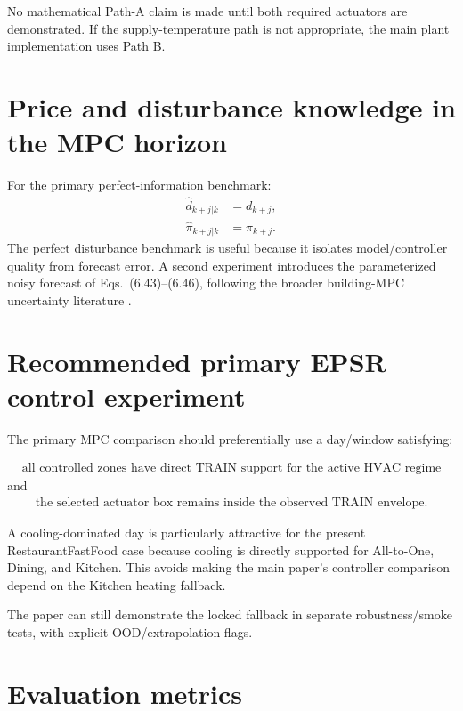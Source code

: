 \documentclass[11pt]{article}
\begin{document}
No mathematical Path-A claim is made until both required actuators are demonstrated.  If the
supply-temperature path is not appropriate, the main plant implementation uses Path B.

\section{Price and disturbance knowledge in the MPC horizon}

For the primary perfect-information benchmark:
\begin{align}
\widehat d_{k+j|k}&=d_{k+j},
\\
\widehat \pi_{k+j|k}&=\pi_{k+j}.
\tag{6.78}
\end{align}
The perfect disturbance benchmark is useful because it isolates model/controller quality from
forecast error.  A second experiment introduces the parameterized noisy forecast of
Eqs.~(6.43)--(6.46), following the broader building-MPC uncertainty literature
\citep{oldewurtel2014stochastic,drgona2020all}.

\section{Recommended primary EPSR control experiment}

The primary MPC comparison should preferentially use a day/window satisfying:

\begin{align}
\boxed{\text{all controlled zones have direct TRAIN support for the active HVAC regime}}
\end{align}
and
\begin{align}
\boxed{\text{the selected actuator box remains inside the observed TRAIN envelope.}}
\end{align}

A cooling-dominated day is particularly attractive for the present RestaurantFastFood case because
cooling is directly supported for All-to-One, Dining, and Kitchen.  This avoids making the main
paper's controller comparison depend on the Kitchen heating fallback.

The paper can still demonstrate the locked fallback in separate robustness/smoke tests, with
explicit OOD/extrapolation flags.

\section{Evaluation metrics}
\end{document}
